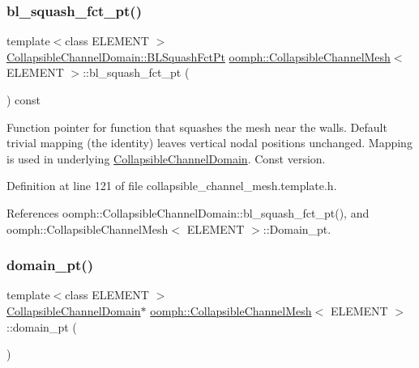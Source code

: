 \subsubsection{\texorpdfstring{bl\+\_\+squash\+\_\+fct\+\_\+pt()}{bl\_squash\_fct\_pt()}\hspace{0.1cm}{\footnotesize\ttfamily [2/2]}}
{\footnotesize\ttfamily template$<$class E\+L\+E\+M\+E\+NT $>$ \\
\hyperlink{classoomph_1_1CollapsibleChannelDomain_a2bf1d7943bfac134a5c27a54c7e1faed}{Collapsible\+Channel\+Domain\+::\+B\+L\+Squash\+Fct\+Pt} \hyperlink{classoomph_1_1CollapsibleChannelMesh}{oomph\+::\+Collapsible\+Channel\+Mesh}$<$ E\+L\+E\+M\+E\+NT $>$\+::bl\+\_\+squash\+\_\+fct\+\_\+pt (\begin{DoxyParamCaption}{ }\end{DoxyParamCaption}) const\hspace{0.3cm}{\ttfamily [inline]}}



Function pointer for function that squashes the mesh near the walls. Default trivial mapping (the identity) leaves vertical nodal positions unchanged. Mapping is used in underlying \hyperlink{classoomph_1_1CollapsibleChannelDomain}{Collapsible\+Channel\+Domain}. Const version. 



Definition at line 121 of file collapsible\+\_\+channel\+\_\+mesh.\+template.\+h.



References oomph\+::\+Collapsible\+Channel\+Domain\+::bl\+\_\+squash\+\_\+fct\+\_\+pt(), and oomph\+::\+Collapsible\+Channel\+Mesh$<$ E\+L\+E\+M\+E\+N\+T $>$\+::\+Domain\+\_\+pt.

\mbox{\label{classoomph_1_1CollapsibleChannelMesh_a379365813e6c3566639dc55a971f0b10}} 
\subsubsection{\texorpdfstring{domain\+\_\+pt()}{domain\_pt()}}
{\footnotesize\ttfamily template$<$class E\+L\+E\+M\+E\+NT $>$ \\
\hyperlink{classoomph_1_1CollapsibleChannelDomain}{Collapsible\+Channel\+Domain}$\ast$ \hyperlink{classoomph_1_1CollapsibleChannelMesh}{oomph\+::\+Collapsible\+Channel\+Mesh}$<$ E\+L\+E\+M\+E\+NT $>$\+::domain\+\_\+pt (\begin{DoxyParamCaption}{ }\end{DoxyParamCaption})\hspace{0.3cm}{\ttfamily [inline]}}



